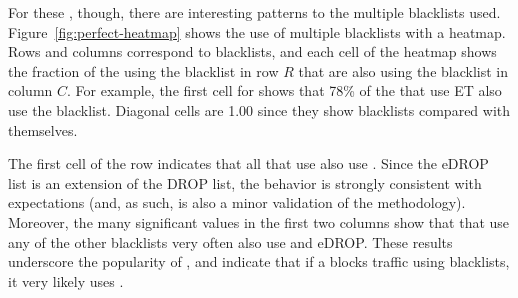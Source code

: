 For these {}, though, there are interesting patterns to the
multiple blacklists used.  Figure~\ref{fig:perfect-heatmap} shows the
use of multiple blacklists with a heatmap.  Rows and columns
correspond to blacklists, and each cell of the heatmap shows the
fraction of the {} using the blacklist in row $R$ that are
also using the blacklist in column $C$.  For example, the first cell
for {\etcompromised} shows that 78\% of the {} that use ET
also use the {\spamhausdrop} blacklist.  Diagonal cells are 1.00 since
they show blacklists compared with themselves.

The first cell of the {\spamhausedrop} row indicates that all
{} that use {\spamhausedrop} also use {\spamhausdrop}.
Since the eDROP list is an extension of the DROP list, the behavior is
strongly consistent with expectations (and, as such, is also a minor
validation of the methodology).  Moreover, the many significant values
in the first two columns show that {} that use any of the
other blacklists very often also use {\spamhausdrop} and eDROP.  These
results underscore the popularity of {\spamhausdrop}, and indicate
that if a {} blocks traffic using blacklists, it very likely
uses {\spamhausdrop}.



